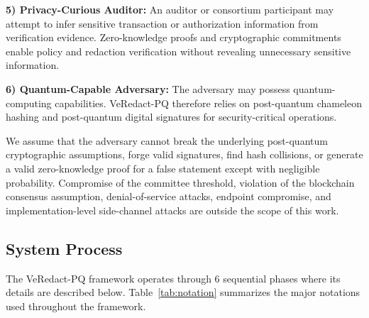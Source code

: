 \documentclass[lettersize,journal]{IEEEtran}
\begin{document}
\textbf{5) Privacy-Curious Auditor:}
An auditor or consortium participant may attempt to infer sensitive
transaction or authorization information from verification evidence.
Zero-knowledge proofs and cryptographic commitments enable policy and
redaction verification without revealing unnecessary sensitive
information.

\textbf{6) Quantum-Capable Adversary:}
The adversary may possess quantum-computing capabilities. VeRedact-PQ
therefore relies on post-quantum chameleon hashing and post-quantum
digital signatures for security-critical operations.

We assume that the adversary cannot break the underlying post-quantum
cryptographic assumptions, forge valid signatures, find hash
collisions, or generate a valid zero-knowledge proof for a false
statement except with negligible probability. Compromise of the
committee threshold, violation of the blockchain consensus assumption,
denial-of-service attacks, endpoint compromise, and implementation-level
side-channel attacks are outside the scope of this work.



\subsection{System Process}

The VeRedact-PQ framework operates through 6 sequential phases where its details are described below. Table~\ref{tab:notation} summarizes the major notations used throughout the framework.
\end{document}
